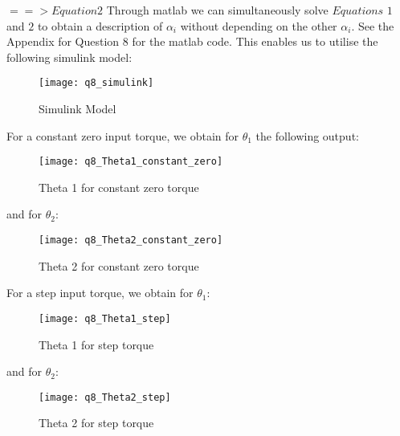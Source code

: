 	\hspace{30mm}$==> Equation 2$\newline\newline
	\newline
	Through matlab we can simultaneously solve $Equations$ $1$ and $2$ to obtain a description of $\alpha _{i}$ without depending on the other $\alpha _{i}$.\newline
	See the Appendix for Question 8 for the matlab code.\newline
	This enables us to utilise the following simulink model:\newline
	\begin{figure}[position = here]
		\begin{centering}
			\texttt{[image: q8\_simulink]}\\
			\caption [WSpace]{Simulink Model}
		\end{centering}
	\end{figure}
	\newline
	\pagebreak
	For a constant zero input torque, we obtain for $\theta _{1}$ the following output:\newline
	\begin{figure}[position = here]
		\begin{centering}
			\texttt{[image: q8\_Theta1\_constant\_zero]}\\
			\caption [WSpace]{Theta 1 for constant zero torque}
		\end{centering}
	\end{figure}
	
	\newline and for $\theta _{2}$:\newline
	\begin{figure}[position = here]
		\begin{centering}
			\texttt{[image: q8\_Theta2\_constant\_zero]}\\
			\caption [WSpace]{Theta 2 for constant zero torque}
		\end{centering}
	\end{figure}
	\pagebreak
	\newline For a step input torque, we obtain for $\theta _{1}$:\newline
	\begin{figure}[position = here]
		\begin{centering}
			\texttt{[image: q8\_Theta1\_step]}\\
			\caption [WSpace]{Theta 1 for step torque}
		\end{centering}
	\end{figure}
	\newline and for $\theta _{2}$:\newline
	\begin{figure}[position = here]
		\begin{centering}
			\texttt{[image: q8\_Theta2\_step]}\\
			\caption [WSpace]{Theta 2 for step torque}
		\end{centering}
	\end{figure}

